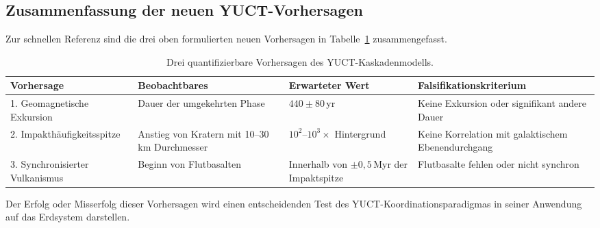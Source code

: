 \documentclass[11pt,a4paper]{article}
\begin{document}
	\subsection{Zusammenfassung der neuen YUCT-Vorhersagen}
	
	Zur schnellen Referenz sind die drei oben formulierten neuen Vorhersagen in Tabelle~\ref{tab:new_predictions} zusammengefasst.
	
	\begin{table}[H]
		\centering
		\small
		\caption{Drei quantifizierbare Vorhersagen des YUCT-Kaskadenmodells.}
		\label{tab:new_predictions}
		\begin{tabular}{p{3.9cm} p{4.4cm} p{4.7cm} p{4.0cm}}
			\toprule
			\textbf{Vorhersage} & \textbf{Beobachtbares} & \textbf{Erwarteter Wert} & \textbf{Falsifikationskriterium} \\
			\midrule
			1. Geomagnetische Exkursion & Dauer der umgekehrten Phase & \(440 \pm 80\) yr & Keine Exkursion oder signifikant andere Dauer \\
			2. Impakthäufigkeitsspitze & Anstieg von Kratern mit 10–30 km Durchmesser & \(10^{2}\)–\(10^{3}\times\) Hintergrund & Keine Korrelation mit galaktischem Ebenendurchgang \\
			3. Synchronisierter Vulkanismus & Beginn von Flutbasalten & Innerhalb von \(\pm 0,5\) Myr der Impaktspitze & Flutbasalte fehlen oder nicht synchron \\
			\bottomrule
		\end{tabular}
	\end{table}
	
	Der Erfolg oder Misserfolg dieser Vorhersagen wird einen entscheidenden Test des YUCT-Koordinationsparadigmas in seiner Anwendung auf das Erdsystem darstellen.
	
\end{document}
